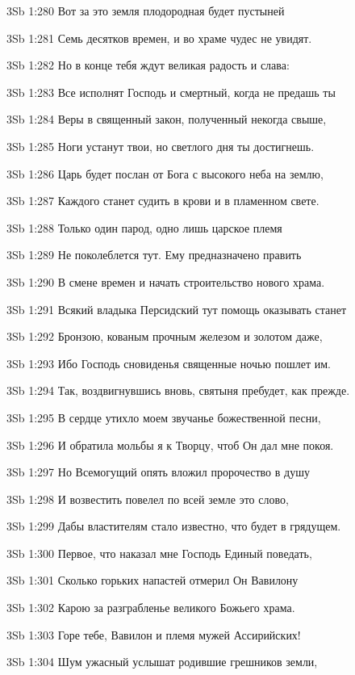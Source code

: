 \vs 3Sb 1:280 Вот за это земля плодородная будет пустыней 

\vs 3Sb 1:281 Семь десятков времен, и во храме чудес не увидят. 

\vs 3Sb 1:282 Но в конце тебя ждут великая радость и слава: 

\vs 3Sb 1:283 Все исполнят Господь и смертный, когда не предашь ты 

\vs 3Sb 1:284 Веры в священный закон, полученный некогда свыше, 

\vs 3Sb 1:285 Ноги устанут твои, но светлого дня ты достигнешь.

\vs 3Sb 1:286 Царь будет послан от Бога с высокого неба на землю,

\vs 3Sb 1:287 Каждого станет судить в крови и в пламенном свете. 

\vs 3Sb 1:288 Только один парод, одно лишь царское племя 

\vs 3Sb 1:289 Не поколеблется тут. Ему предназначено править 

\vs 3Sb 1:290 В смене времен и начать строительство нового храма. 

\vs 3Sb 1:291 Всякий владыка Персидский тут помощь оказывать станет 

\vs 3Sb 1:292 Бронзою, кованым прочным железом и золотом даже, 

\vs 3Sb 1:293 Ибо Господь сновиденья священные ночью пошлет им. 

\vs 3Sb 1:294 Так, воздвигнувшись вновь, святыня пребудет, как прежде.

\vs 3Sb 1:295 В сердце утихло моем звучанье божественной песни, 

\vs 3Sb 1:296 И обратила мольбы я к Творцу, чтоб Он дал мне покоя.

\vs 3Sb 1:297 Но Всемогущий опять вложил пророчество в душу

\vs 3Sb 1:298 И возвестить повелел по всей земле это слово,

\vs 3Sb 1:299 Дабы властителям стало известно, что будет в грядущем.

\vs 3Sb 1:300 Первое, что наказал мне Господь Единый поведать,  

\vs 3Sb 1:301 Сколько горьких напастей отмерил Он Вавилону 

\vs 3Sb 1:302 Карою за разграбленье великого Божьего храма. 

\vs 3Sb 1:303 Горе тебе, Вавилон и племя мужей Ассирийских! 

\vs 3Sb 1:304 Шум ужасный услышат родившие грешников земли,

